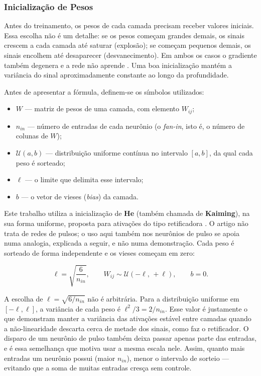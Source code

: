 			\subsubsection{Inicialização de Pesos}
				\label{sec:init}

				\par Antes do treinamento, os pesos de cada camada precisam receber valores iniciais. Essa escolha não é um detalhe: se os pesos começam grandes demais, os sinais crescem a cada camada até saturar (explosão); se começam pequenos demais, os sinais encolhem até desaparecer (desvanecimento). Em ambos os casos o gradiente também degenera e a rede não aprende \cite{glorot2010understanding}. Uma boa inicialização mantém a variância do sinal aproximadamente constante ao longo da profundidade.

				\par Antes de apresentar a fórmula, definem-se os símbolos utilizados:
				\begin{itemize}
					\item $W$ --- matriz de pesos de uma camada, com elemento $W_{ij}$;
					\item $n_{in}$ --- número de entradas de cada neurônio (o \textit{fan-in}, isto é, o número de colunas de $W$);
					\item $\mathcal{U}(a,b)$ --- distribuição uniforme contínua no intervalo $[a,b]$, da qual cada peso é sorteado;
					\item $\ell$ --- o limite que delimita esse intervalo;
					\item $b$ --- o vetor de vieses (\textit{bias}) da camada.
				\end{itemize}

				\par Este trabalho utiliza a inicialização de \textbf{He} (também chamada de \textbf{Kaiming}), na sua forma uniforme, proposta para ativações do tipo retificadora \cite{he2015delving}. O artigo não trata de redes de pulsos; o uso aqui também nos neurônios de pulso se apoia numa analogia, explicada a seguir, e não numa demonstração. Cada peso é sorteado de forma independente e os vieses começam em zero:

				\begin{equation}
					\label{eq:kaiming}
					\ell = \sqrt{\frac{6}{n_{in}}}, \qquad
					W_{ij} \sim \mathcal{U}(-\ell,\,+\ell), \qquad
					b = 0.
				\end{equation}

				\par A escolha de $\ell = \sqrt{6/n_{in}}$ não é arbitrária. Para a distribuição uniforme em $[-\ell,\ell]$, a variância de cada peso é $\ell^2/3 = 2/n_{in}$. Esse valor é justamente o que  demonstram manter a variância das ativações estável entre camadas quando a não-linearidade descarta cerca de metade dos sinais, como faz o retificador. O disparo de um neurônio de pulso também deixa passar apenas parte das entradas, e é essa semelhança que motiva usar a mesma escala nele. Assim, quanto mais entradas um neurônio possui (maior $n_{in}$), menor o intervalo de sorteio --- evitando que a soma de muitas entradas cresça sem controle.

